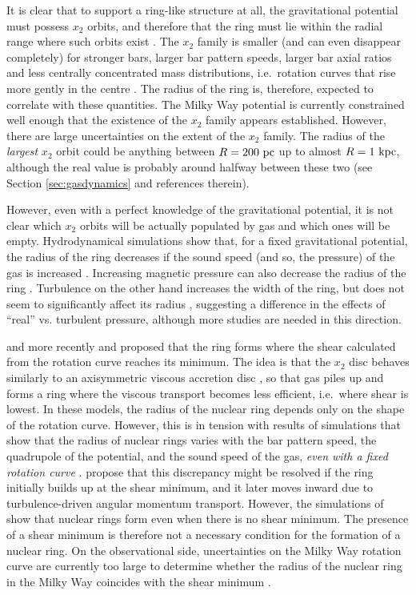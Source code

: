 It is clear that to support a ring-like structure at all, the gravitational potential must possess $x_2$ orbits, and therefore that the ring must lie within the radial range where such orbits exist \citep{Athanassoula1992b,Regan2003,Kim2012b}.  The $x_2$ family is smaller (and can even disappear completely) for stronger bars, larger bar pattern speeds, larger bar axial ratios and less centrally concentrated mass distributions, i.e.\ rotation curves that rise more gently in the centre \citep{Athanassoula1992a}. The radius of the ring is, therefore, expected to correlate with these quantities. 
The Milky Way potential is currently constrained well enough that the existence of the $x_2$ family appears established. However, there are large uncertainties on the extent of the $x_2$ family. The radius of the \emph{largest} $x_2$ orbit could be anything between $R=200~\mbox{${\rm pc}$}$ up to almost $R=1~\mbox{${\rm kpc}$}$, although the real value is probably around halfway between these two (see Section \ref{sec:gasdynamics} and references therein).

However, even with a perfect knowledge of the gravitational potential, it is not clear which $x_2$ orbits will be actually populated by gas and which ones will be empty. Hydrodynamical simulations show that, for a fixed gravitational potential, the radius of the ring decreases if the sound speed (and so, the pressure) of the gas is increased \citep{Englmaier1997,Patsis2000,Sormani2015c,Li2015}. Increasing magnetic pressure can also decrease the radius of the ring \citep{Kim2012c}. Turbulence on the other hand increases the width of the ring, but does not seem to significantly affect its radius \citep{Salas2020}, suggesting a difference in the effects of ``real'' vs. turbulent pressure, although more studies are needed in this direction.

\cite{Lesch1990} and more recently \cite{Krumholz2015} and \cite{Krumholz2017} proposed that the ring forms where the shear calculated from the rotation curve reaches its minimum. The idea is that the $x_2$ disc behaves similarly to an axisymmetric viscous accretion disc \citep{Lynden-Bell1974}, so that gas piles up and forms a ring where the viscous transport becomes less efficient, i.e.\ where shear is lowest. In these models, the radius of the nuclear ring depends only on the shape of the rotation curve. However, this is in tension with results of simulations that show that the radius of nuclear rings varies with the bar pattern speed, the quadrupole of the potential, and the sound speed of the gas, \emph{even with a fixed rotation curve} \citep{Patsis2000,Kim2012a,Sormani2015a}. \citet{Armillotta2019} propose that this discrepancy might be resolved if the ring initially builds up at the shear minimum, and it later moves inward due to turbulence-driven angular momentum transport. However, the simulations of \cite{Sormani2020c} show that nuclear rings form even when there is no shear minimum. The presence of a shear minimum is therefore not a necessary condition for the formation of a nuclear ring. On the observational side, uncertainties on the Milky Way rotation curve are currently too large to determine whether the radius of the nuclear ring in the Milky Way coincides with the shear minimum \citep{Sormani2020a}.


